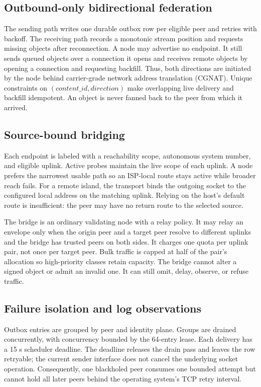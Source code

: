 \documentclass[conference,a4paper]{IEEEtran}
\begin{document}
\subsection{Outbound-only bidirectional federation}

The sending path writes one durable outbox row per eligible peer and retries with backoff. The
receiving path records a monotonic stream position and requests missing objects after reconnection.
A node may advertise no endpoint. It still sends queued objects over a connection it opens and
receives remote objects by opening a connection and requesting backfill. Thus, both directions are
initiated by the node behind carrier-grade network address translation (CGNAT). Unique constraints on
$(\mathit{content\_id},\mathit{direction})$ make overlapping live delivery and backfill idempotent.
An object is never fanned back to the peer from which it arrived.

\subsection{Source-bound bridging}

Each endpoint is labeled with a reachability scope, autonomous system number, and eligible uplink.
Active probes maintain the live scope of each uplink. A node prefers the narrowest usable path so an
ISP-local route stays active while broader reach fails. For a remote island, the transport binds the
outgoing socket to the configured local address on the matching uplink. Relying on the host's default
route is insufficient: the peer may have no return route to the selected source.

The bridge is an ordinary validating node with a relay policy. It may relay an envelope only when
the origin peer and a target peer resolve to different uplinks and the bridge has trusted peers on
both sides. It charges one quota per uplink pair, not once per target peer. Bulk traffic is capped at
half of the pair's allocation so high-priority classes retain capacity. The bridge cannot alter a
signed object or admit an invalid one. It can still omit, delay, observe, or refuse traffic.

\subsection{Failure isolation and log observations}

Outbox entries are grouped by peer and identity plane. Groups are drained concurrently, with
concurrency bounded by the 64-entry lease. Each delivery has a 15 s scheduler deadline. The deadline
releases the drain pass and leaves the row retryable; the current sender interface does not cancel the
underlying socket operation. Consequently, one blackholed peer consumes one bounded attempt but
cannot hold all later peers behind the operating system's TCP retry interval.
\end{document}
